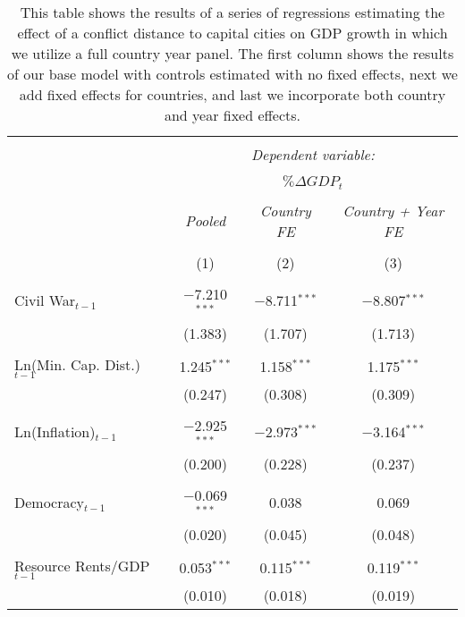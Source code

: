\begin{table}[!htbp] \centering 
  \caption{This table shows the results of a series of regressions estimating the effect of a conflict distance to capital cities on GDP growth in which we utilize a full country year panel. The first column shows the results of our base model with controls estimated with no fixed effects, next we add fixed effects for countries, and last we incorporate both country and year fixed effects.} 
  \label{tab:capFullPiecewiseFE} 
\begin{tabular}{@{\extracolsep{5pt}}lccc} 
\\[-1.8ex]\hline 
\hline \\[-1.8ex] 
 & \multicolumn{3}{c}{\textit{Dependent variable:}} \\ 
\cline{2-4} 
\\[-1.8ex] & \multicolumn{3}{c}{$\% \Delta GDP_{t}$} \\ 
\\[-1.8ex] & \textit{Pooled} 
 & \textit{Country FE} & \textit{Country + Year FE} \\ 
\\[-1.8ex] & (1) & (2) & (3)\\ 
\hline \\[-1.8ex] 
 Civil War$_{t-1}$ & $-$7.210$^{***}$ & $-$8.711$^{***}$ & $-$8.807$^{***}$ \\ 
  & (1.383) & (1.707) & (1.713) \\ 
  & & & \\ 
 Ln(Min. Cap. Dist.)$_{t-1}$ & 1.245$^{***}$ & 1.158$^{***}$ & 1.175$^{***}$ \\ 
  & (0.247) & (0.308) & (0.309) \\ 
  & & & \\ 
 Ln(Inflation)$_{t-1}$ & $-$2.925$^{***}$ & $-$2.973$^{***}$ & $-$3.164$^{***}$ \\ 
  & (0.200) & (0.228) & (0.237) \\ 
  & & & \\ 
 Democracy$_{t-1}$ & $-$0.069$^{***}$ & 0.038 & 0.069 \\ 
  & (0.020) & (0.045) & (0.048) \\ 
  & & & \\ 
 Resource Rents/GDP$_{t-1}$ & 0.053$^{***}$ & 0.115$^{***}$ & 0.119$^{***}$ \\ 
  & (0.010) & (0.018) & (0.019) \\ 

\end{tabular}
\end{table}
